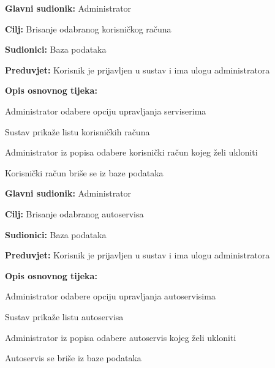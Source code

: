 \noindent {}
\begin{packed_item}

	\item \textbf{Glavni sudionik: } Administrator
	\item  \textbf{Cilj:} Brisanje odabranog korisničkog računa
	\item  \textbf{Sudionici:} Baza podataka
	\item  \textbf{Preduvjet:} Korisnik je prijavljen u sustav i ima ulogu administratora

	\item  \textbf{Opis osnovnog tijeka:}

	\item[] \begin{packed_enum}

		\item Administrator odabere opciju upravljanja
		serviserima
		\item Sustav prikaže listu korisničkih računa
		\item Administrator iz popisa odabere korisnički račun kojeg želi ukloniti
		\item Korisnički račun briše se iz baze podataka

	\end{packed_enum}
\end{packed_item}

\noindent {}
\begin{packed_item}

	\item \textbf{Glavni sudionik: } Administrator
	\item  \textbf{Cilj:} Brisanje odabranog autoservisa
	\item  \textbf{Sudionici:} Baza podataka
	\item  \textbf{Preduvjet:} Korisnik je prijavljen u sustav i ima ulogu administratora
	\item  \textbf{Opis osnovnog tijeka:}

	\item[] \begin{packed_enum}

		\item Administrator odabere opciju upravljanja autoservisima
		\item Sustav prikaže listu autoservisa
		\item Administrator iz popisa odabere autoservis kojeg želi ukloniti
		\item Autoservis se briše iz baze podataka
	\end{packed_enum}
\end{packed_item}

